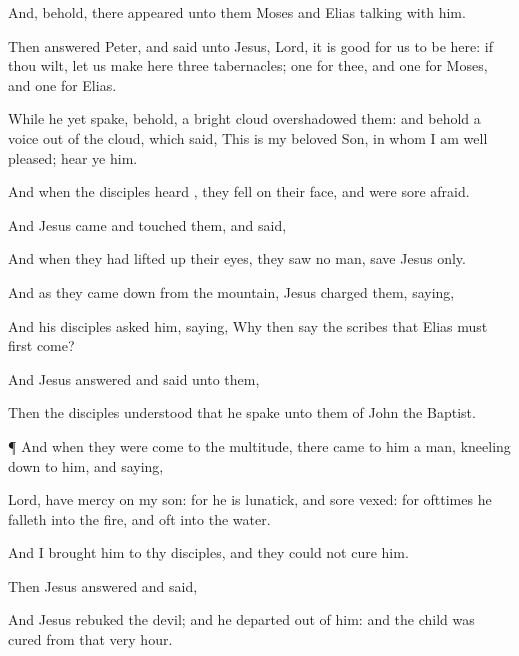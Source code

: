{And,
behold, there
appeared unto
them
Moses
and
Elias
talking
with
him.

Then
answered
Peter, and
said unto
Jesus,
Lord, it
is
good for
us to
be
here:
if thou
wilt, let us
make
here
three
tabernacles;
one for
thee,
and
one for
Moses,
and
one for
Elias.

While
he
yet
spake,
behold,
a
bright
cloud
overshadowed
them:
and
behold a
voice out
of the
cloud, which
said,
This
is
my
beloved
Son,
in
whom I am well
pleased; hear
ye
him.

And
when the
disciples
heard
{}, they
fell
on
their
face,
and
were
sore
afraid.

And
Jesus
came and
touched
them,
and
said,
{}

And when they had lifted
up
their
eyes, they
saw no
man,
save
Jesus
only.

And
as
they came
down
from the
mountain,
Jesus
charged
them,
saying,
{}

And
his
disciples
asked
him,
saying,
Why
then
say the
scribes
that
Elias
must
first
come?

And
Jesus
answered and
said unto
them,
{}


Then the
disciples
understood
that he
spake unto
them
of
John the
Baptist.


\par }{\PP {}¶
And
when
they were
come
to the
multitude, there
came to
him
a
{}
man, kneeling
down to
him,
and
saying,

Lord, have
mercy
on
my
son:
for he is
lunatick,
and
sore
vexed:
for
ofttimes he
falleth
into the
fire,
and
oft
into the
water.

And I
brought
him
to
thy
disciples,
and they
could
not
cure
him.

Then
Jesus
answered and
said,
{}

And
Jesus
rebuked the
devil;
and
he
departed
out of
him:
and the
child was
cured
from that
very
hour.

}
